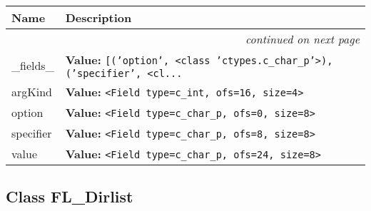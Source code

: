     \vspace{-1cm}
\hspace{\varindent}\begin{longtable}{|p{\varnamewidth}|p{\vardescrwidth}|l}
\cline{1-2}
\cline{1-2} \centering \textbf{Name} & \centering \textbf{Description}& \\
\cline{1-2}
\endhead\cline{1-2}\multicolumn{3}{r}{\small\textit{continued on next page}}\\\endfoot\cline{1-2}
\endlastfoot\raggedright \_\-f\-i\-e\-l\-d\-s\-\_\- & \raggedright \textbf{Value:} 
{\tt \texttt{[}\texttt{(}\texttt{'}\texttt{option}\texttt{'}\texttt{, }{\textless}class 'ctypes.c\_char\_p'{\textgreater}\texttt{)}\texttt{, }\texttt{(}\texttt{'}\texttt{specifier}\texttt{'}\texttt{, }{\textless}cl\texttt{...}}&\\
\cline{1-2}
\raggedright a\-r\-g\-K\-i\-n\-d\- & \raggedright \textbf{Value:} 
{\tt {\textless}Field type=c\_int, ofs=16, size=4{\textgreater}}&\\
\cline{1-2}
\raggedright o\-p\-t\-i\-o\-n\- & \raggedright \textbf{Value:} 
{\tt {\textless}Field type=c\_char\_p, ofs=0, size=8{\textgreater}}&\\
\cline{1-2}
\raggedright s\-p\-e\-c\-i\-f\-i\-e\-r\- & \raggedright \textbf{Value:} 
{\tt {\textless}Field type=c\_char\_p, ofs=8, size=8{\textgreater}}&\\
\cline{1-2}
\raggedright v\-a\-l\-u\-e\- & \raggedright \textbf{Value:} 
{\tt {\textless}Field type=c\_char\_p, ofs=24, size=8{\textgreater}}&\\
\cline{1-2}
\end{longtable}



\subsection{Class FL\_Dirlist}

